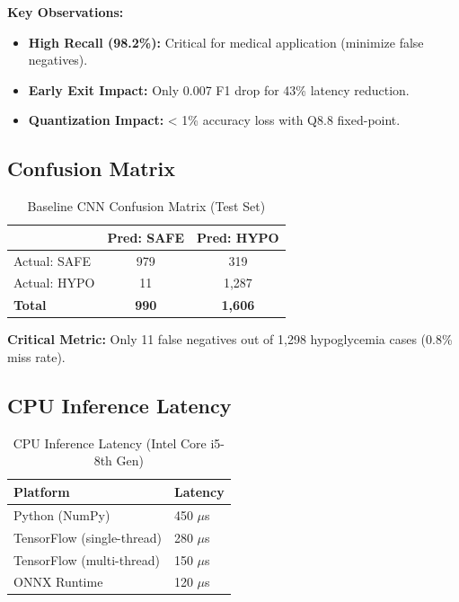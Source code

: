 \documentclass[11pt, a4paper]{article}
\begin{document}
\textbf{Key Observations:}
\begin{itemize}
    \item \textbf{High Recall (98.2\%):} Critical for medical application (minimize false negatives).
    \item \textbf{Early Exit Impact:} Only 0.007 F1 drop for 43\% latency reduction.
    \item \textbf{Quantization Impact:} < 1\% accuracy loss with Q8.8 fixed-point.
\end{itemize}

\subsection{Confusion Matrix}

\begin{table}[H]
\centering
\caption{Baseline CNN Confusion Matrix (Test Set)}
\label{tab:confusion}
\begin{tabular}{@{}lcc@{}}
\toprule
 & \textbf{Pred: SAFE} & \textbf{Pred: HYPO} \\ \midrule
Actual: SAFE & 979 & 319 \\
Actual: HYPO & 11 & 1,287 \\ \midrule
\textbf{Total} & \textbf{990} & \textbf{1,606} \\ \bottomrule
\end{tabular}
\end{table}

\textbf{Critical Metric:} Only 11 false negatives out of 1,298 hypoglycemia cases (0.8\% miss rate).

\subsection{CPU Inference Latency}

\begin{table}[H]
\centering
\caption{CPU Inference Latency (Intel Core i5-8th Gen)}
\label{tab:cpu_latency}
\begin{tabular}{@{}ll@{}}
\toprule
\textbf{Platform} & \textbf{Latency} \\ \midrule
Python (NumPy) & 450 $\mu$s \\
TensorFlow (single-thread) & 280 $\mu$s \\
TensorFlow (multi-thread) & 150 $\mu$s \\
ONNX Runtime & 120 $\mu$s \\ \bottomrule
\end{tabular}
\end{table}
\end{document}
